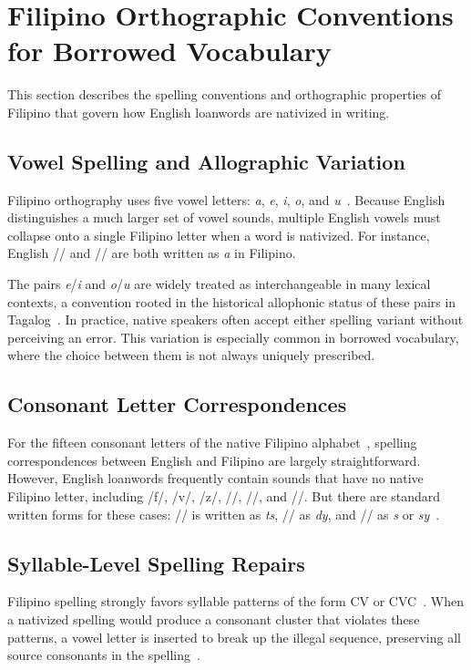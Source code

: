 \section{Filipino Orthographic Conventions for Borrowed Vocabulary}\label{sec:filipino_orthography_and_phonology}

This section describes the spelling conventions and orthographic properties of
Filipino that govern how English loanwords are nativized in writing.

\subsection{Vowel Spelling and Allographic Variation}

Filipino orthography uses five vowel letters: \emph{a}, \emph{e}, \emph{i},
\emph{o}, and \emph{u}~\cite{almario2014}. Because English distinguishes a much
larger set of vowel sounds, multiple English vowels must collapse onto a single
Filipino letter when a word is nativized. For instance, English /\textipa{\ae}/
and // are both written as \emph{a} in Filipino.

The pairs \emph{e}/\emph{i} and \emph{o}/\emph{u} are widely treated as
interchangeable in many lexical contexts, a convention rooted in the historical
allophonic status of these pairs in Tagalog~\cite{schachter1972}. In practice,
native speakers often accept either spelling variant without perceiving an
error. This variation is especially common in borrowed vocabulary, where the
choice between them is not always uniquely prescribed.

\subsection{Consonant Letter Correspondences}

For the fifteen consonant letters of the native Filipino
alphabet~\cite{llamzon1966}, spelling correspondences between English and
Filipino are largely straightforward. However, English loanwords frequently
contain sounds that have no native Filipino letter, including /f/, /v/, /z/,
//, //, and //. But there are standard
written forms for these cases: // is written as \emph{ts},
// as \emph{dy}, and // as \emph{s} or
\emph{sy}~\cite{almario2014,llamzon1966}.

\subsection{Syllable-Level Spelling Repairs}

Filipino spelling strongly favors syllable patterns of the form CV or
CVC~\cite{llamzon1966}. When a nativized spelling would produce a consonant
cluster that violates these patterns, a
vowel letter is inserted to break up the illegal sequence, preserving all
source consonants in the spelling~\cite{almario2014}. 
